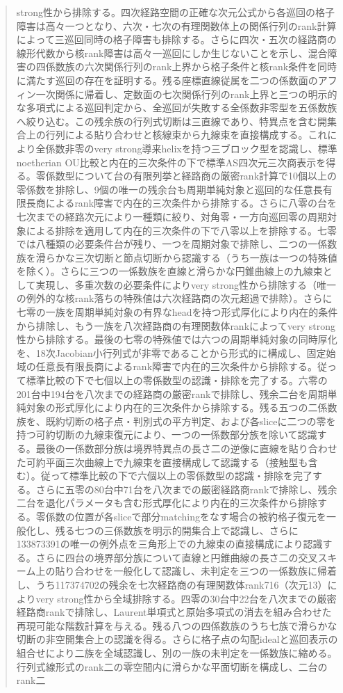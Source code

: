 \documentclass[11pt,a4paper]{ltjsarticle}
\theoremstyle{definition}
\begin{document}
\begin{abstract}
strong性から排除する。四次経路空間の正確な次元公式から各巡回の格子障害は高々一つとなり、六次・七次の有理関数体上の関係行列のrank計算によって三巡回同時の格子障害も排除する。さらに四次・五次の経路商の線形代数から核rank障害は高々一巡回にしか生じないことを示し、混合障害の四係数族の六次関係行列のrank上界から格子条件と核rank条件を同時に満たす巡回の存在を証明する。残る座標直線従属を二つの係数面のアフィン一次関係に帰着し、定数面の七次関係行列のrank上界と三つの明示的な多項式による巡回判定から、全巡回が失敗する全係数非零型を五係数族へ絞り込む。この残余族の行列式切断は三直線であり、特異点を含む開集合上の行列による貼り合わせと核線束から九線束を直接構成する。これにより全係数非零のvery strong導来helixを持つ三ブロック型を認識し、標準noetherian OU比較と内在的三次条件の下で標準AS四次元三次商表示を得る。零係数型について台の有限列挙と経路商の厳密rank計算で10個以上の零係数を排除し、9個の唯一の残余台も周期単純対象と巡回的な任意長有限長商によるrank障害で内在的三次条件から排除する。さらに八零の台を七次までの経路次元により一種類に絞り、対角零・一方向巡回零の周期対象による排除を適用して内在的三次条件の下で八零以上を排除する。七零では八種類の必要条件台が残り、一つを周期対象で排除し、二つの一係数族を滑らかな三次切断と節点切断から認識する（うち一族は一つの特殊値を除く）。さらに三つの一係数族を直線と滑らかな円錐曲線上の九線束として実現し、多重次数の必要条件によりvery strong性から排除する（唯一の例外的な核rank落ちの特殊値は六次経路商の次元超過で排除）。さらに七零の一族を周期単純対象の有界なheadを持つ形式厚化により内在的条件から排除し、もう一族を八次経路商の有理関数体rankによってvery strong性から排除する。最後の七零の特殊値では六つの周期単純対象の同時厚化を、18次Jacobian小行列式が非零であることから形式的に構成し、固定始域の任意長有限長商によるrank障害で内在的三次条件から排除する。従って標準比較の下で七個以上の零係数型の認識・排除を完了する。六零の201台中194台を八次までの経路商の厳密rankで排除し、残余二台を周期単純対象の形式厚化により内在的三次条件から排除する。残る五つの二係数族を、既約切断の格子点・判別式の平方判定、および各sliceに二つの零を持つ可約切断の九線束復元により、一つの一係数部分族を除いて認識する。最後の一係数部分族は境界特異点の長さ二の逆像に直線を貼り合わせた可約平面三次曲線上で九線束を直接構成して認識する（接触型も含む）。従って標準比較の下で六個以上の零係数型の認識・排除を完了する。さらに五零の80台中71台を八次までの厳密経路商rankで排除し、残余二台を退化パラメータも含む形式厚化により内在的三次条件から排除する。零係数の位置が各sliceで部分matchingをなす場合の被約格子復元を一般化し、残る七つの三係数族を明示的開集合上で認識し、さらに133873391の唯一の例外点を三角形上での九線束の直接構成により認識する。さらに四台の境界部分族について直線と円錐曲線の長さ二の交叉スキーム上の貼り合わせを一般化して認識し、未判定を三つの一係数族に帰着し、うち117374702の残余を七次経路商の有理関数体rank716（次元13）によりvery strong性から全域排除する。四零の30台中22台を八次までの厳密経路商rankで排除し、Laurent単項式と原始多項式の消去を組み合わせた再現可能な階数計算を与える。残る八つの四係数族のうち七族で滑らかな切断の非空開集合上の認識を得る。さらに格子点の勾配idealと巡回表示の組合せにより二族を全域認識し、別の一族の未判定を一係数族に縮める。行列式線形式のrank二の零空間内に滑らかな平面切断を構成し、二台のrank二 
\end{abstract}
\end{document}
